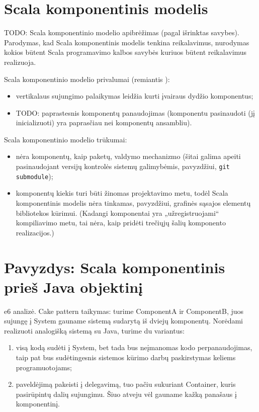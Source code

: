 \section{Scala komponentinis modelis}

TODO: Scala komponentinio modelio apibrėžimas (pagal išrinktas savybes).
Parodymas, kad Scala komponentinis modelis tenkina reikalavimus,
nurodymas kokios būtent Scala programavimo kalbos savybės kuriuos
būtent reikalavimus realizuoja.

Scala komponentinio modelio privalumai (remiantis
\cite{classification-framework-for-scm}):
\begin{itemize}
  \item vertikalaus sujungimo\cite[599]{classification-framework-for-scm}
    palaikymas leidžia kurti įvairaus dydžio  komponentus;
  \item TODO: paprastesnis komponentų panaudojimas (komponentu
    pasinaudoti (jį inicializuoti) yra paprasčiau nei komponentų
    ansambliu).
\end{itemize}

Scala komponentinio modelio trūkumai:
\begin{itemize}
  \item nėra komponentų, kaip paketų, valdymo mechanizmo (šitai galima
    apeiti pasinaudojant versijų kontrolės sistemų galimybėmis,
    pavyzdžiui, \verb|git submodule|);
  \item komponentų kiekis turi būti žinomas projektavimo metu, todėl
    Scala komponentinis modelis nėra tinkamas, pavyzdžiui,
    grafinės sąsajos elementų bibliotekos 
    kūrimui. (Kadangi komponentai yra „užregistruojami“
    kompiliavimo metu, tai nėra, kaip pridėti trečiųjų šalių
    komponento realizacijos.)
\end{itemize}

\section{Pavyzdys: Scala komponentinis prieš Java objektinį}

e6 analizė. Cake pattern taikymas: turime ComponentA ir ComponentB,
juos sujungę į System gauname sistemą sudarytą iš dviejų komponentų.
Norėdami realizuoti analogišką sistemą su Java, turime du variantus:
\begin{enumerate}
  \item visą kodą sudėti į System, bet tada bus neįmanomas kodo
    perpanaudojimas, taip pat bus sudėtingesnis sistemos kūrimo
    darbų paskirstymas keliems programuotojams;
  \item \label{scala:exmp:enum:2} paveldėjimą pakeisti į delegavimą,
    tuo pačiu sukuriant Container, kuris pasirūpintų dalių
    sujungimu. Šiuo atveju vėl gauname kažką panašaus į
    komponentinį.
\end{enumerate}

